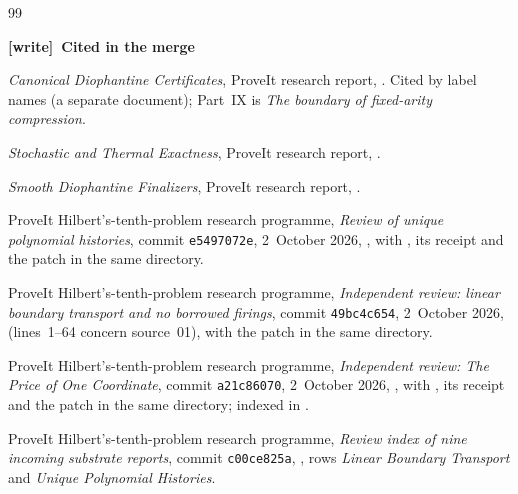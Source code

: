 \documentclass[11pt,letterpaper]{article}
\numberwithin{equation}{section}
\theoremstyle{definition}
\newcommand{\wtag}{\textup{[write]}}
\begin{document}
\begingroup
\small
\raggedright
\begin{thebibliography}{99}
\setlength{\itemsep}{3pt}

\item[] \textbf{\wtag\ Cited in the merge}

\emph{Canonical Diophantine Certificates}, ProveIt research report,
.
Cited by label names (a separate document); Part~IX is \emph{The boundary
of fixed-arity compression}.

\emph{Stochastic and Thermal Exactness}, ProveIt research report,
.

\emph{Smooth Diophantine Finalizers}, ProveIt research report,
.

ProveIt Hilbert's-tenth-problem research programme, \emph{Review of unique
polynomial histories}, commit \texttt{e5497072e}, 2~October 2026,
,
with , its receipt
 and the patch
 in the same directory.

ProveIt Hilbert's-tenth-problem research programme, \emph{Independent
review: linear boundary transport and no borrowed firings}, commit
\texttt{49bc4c654}, 2~October 2026,
(lines~1--64 concern source~01), with the patch
 in the same directory.

ProveIt Hilbert's-tenth-problem research programme, \emph{Independent
review: The Price of One Coordinate}, commit \texttt{a21c86070},
2~October 2026,
,
with , its receipt and the patch
 in the same directory;
indexed in .

ProveIt Hilbert's-tenth-problem research programme, \emph{Review index of
nine incoming substrate reports}, commit \texttt{c00ce825a},
,
rows \emph{Linear Boundary Transport} and \emph{Unique Polynomial Histories}.


\end{thebibliography}
\end{document}

